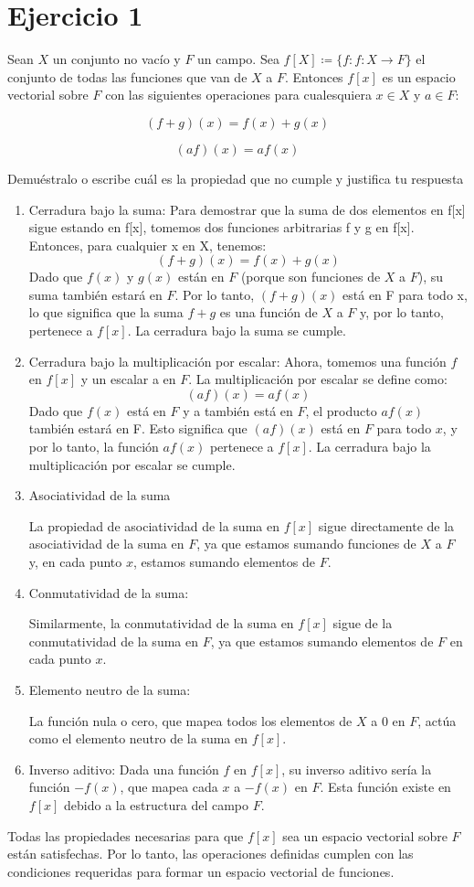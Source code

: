 \section*{Ejercicio 1}

Sean $X$ un conjunto no vacío y $F$ un campo.
Sea $f[X] \coloneqq \{f : f \colon X\to F\}$ el conjunto de todas las funciones que van de $X$ a $F$. Entonces $f[x]$ es un espacio vectorial sobre $F$ con las siguientes operaciones para cualesquiera $x \in X$ y $a \in F$:

$$(f+g)(x) = f(x) + g(x)$$

$$(af)(x) = a f(x)$$


Demuéstralo o escribe cuál es la propiedad que no cumple y justifica tu respuesta

\begin{enumerate}
    \item Cerradura bajo la suma: Para demostrar que la suma de dos elementos en f[x] sigue estando en f[x], tomemos dos funciones arbitrarias f y g en f[x]. Entonces, para cualquier x en X, tenemos:
    $$ (f + g)(x) = f(x) + g(x) $$
    Dado que $f(x)$ y $g(x)$ están en $F$ (porque son funciones de $X$ a $F$), su suma también estará en $F$. Por lo tanto, $(f + g)(x)$ está en F para todo x, lo que significa que la suma $f + g$ es una función de $X$ a $F$ y, por lo tanto, pertenece a $f[x]$. La cerradura bajo la suma se cumple.    

    \item Cerradura bajo la multiplicación por escalar: Ahora, tomemos una función $f$ en $f[x]$ y un escalar a en $F$. La multiplicación por escalar se define como:
    $$(af)(x) = af(x) $$
    Dado que $f(x)$ está en $F$ y a también está en $F$, el producto $af(x)$ también estará en F. Esto significa que $(af)(x)$ está en $F$ para todo $x$, y por lo tanto, la función $af(x)$ pertenece a $f[x]$. La cerradura bajo la multiplicación por escalar se cumple.

    \item Asociatividad de la suma
    
    La propiedad de asociatividad de la suma en $f[x]$ sigue directamente de la asociatividad de la suma en $F$, ya que estamos sumando funciones de $X$ a $F$ y, en cada punto $x$, estamos sumando elementos de $F$.

    \item Conmutatividad de la suma: 
    
    Similarmente, la conmutatividad de la suma en $f[x]$ sigue de la conmutatividad de la suma en $F$, ya que estamos sumando elementos de $F$ en cada punto $x$.

    \item Elemento neutro de la suma: 
    
    La función nula o cero, que mapea todos los elementos de $X$ a $0$ en $F$, actúa como el elemento neutro de la suma en $f[x]$.
    
    \item Inverso aditivo: Dada una función $f$ en $f[x]$, su inverso aditivo sería la función $-f(x)$, que mapea cada $x$ a $-f(x)$ en $F$. Esta función existe en $f[x]$ debido a la estructura del campo $F$.    
\end{enumerate}

Todas las propiedades necesarias para que $f[x]$ sea un espacio vectorial sobre $F$ están satisfechas. Por lo tanto, las operaciones definidas cumplen con las condiciones requeridas para formar un espacio vectorial de funciones.
